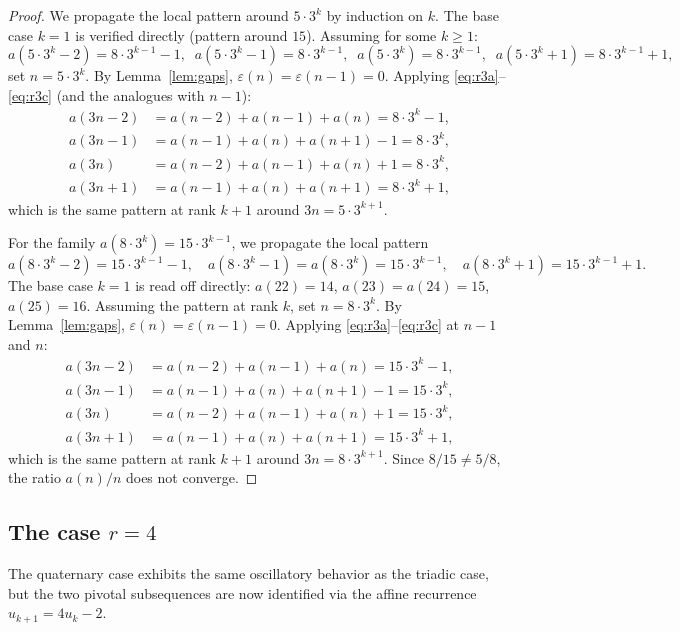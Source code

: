 \documentclass[12pt]{article}
\theoremstyle{definition}
\theoremstyle{remark}
\begin{document}
\begin{proof}
  We propagate the local pattern around $5\cdot 3^k$ by induction on $k$.
  The base case $k=1$ is verified directly (pattern around $15$).
  Assuming for some $k\ge 1$:
  \[
    a(5\cdot 3^k-2)=8\cdot 3^{k-1}-1,\;\;
    a(5\cdot 3^k-1)=8\cdot 3^{k-1},\;\;
    a(5\cdot 3^k)  =8\cdot 3^{k-1},\;\;
    a(5\cdot 3^k+1)=8\cdot 3^{k-1}+1,
  \]
  set $n=5\cdot 3^k$. By Lemma~\ref{lem:gaps}, $\varepsilon(n)=\varepsilon(n-1)=0$.
  Applying \eqref{eq:r3a}--\eqref{eq:r3c} (and the analogues with $n-1$):
  \begin{align*}
    a(3n-2) &= a(n-2)+a(n-1)+a(n)   = 8\cdot 3^k-1,\\
    a(3n-1) &= a(n-1)+a(n)+a(n+1)-1 = 8\cdot 3^k,\\
    a(3n)   &= a(n-2)+a(n-1)+a(n)+1 = 8\cdot 3^k,\\
    a(3n+1) &= a(n-1)+a(n)+a(n+1)   = 8\cdot 3^k+1,
  \end{align*}
  which is the same pattern at rank $k+1$ around $3n=5\cdot 3^{k+1}$.

  For the family $a(8\cdot 3^k)=15\cdot 3^{k-1}$, we propagate the local pattern
  \[
    a(8\cdot 3^k-2)=15\cdot 3^{k-1}-1,\quad
    a(8\cdot 3^k-1)=a(8\cdot 3^k)=15\cdot 3^{k-1},\quad
    a(8\cdot 3^k+1)=15\cdot 3^{k-1}+1.
  \]
  The base case $k=1$ is read off directly: $a(22)=14$, $a(23)=a(24)=15$, $a(25)=16$.
  Assuming the pattern at rank $k$, set $n=8\cdot 3^k$.
  By Lemma~\ref{lem:gaps}, $\varepsilon(n)=\varepsilon(n-1)=0$.
  Applying \eqref{eq:r3a}--\eqref{eq:r3c} at $n-1$ and $n$:
  \begin{align*}
    a(3n-2) &= a(n-2)+a(n-1)+a(n)   = 15\cdot 3^k-1,\\
    a(3n-1) &= a(n-1)+a(n)+a(n+1)-1 = 15\cdot 3^k,\\
    a(3n)   &= a(n-2)+a(n-1)+a(n)+1 = 15\cdot 3^k,\\
    a(3n+1) &= a(n-1)+a(n)+a(n+1)   = 15\cdot 3^k+1,
  \end{align*}
  which is the same pattern at rank $k+1$ around $3n=8\cdot 3^{k+1}$.
  Since $8/15\ne 5/8$, the ratio $a(n)/n$ does not converge.
\end{proof}

\subsection{The case $r=4$}

The quaternary case exhibits the same oscillatory behavior as the triadic case,
but the two pivotal subsequences are now identified via the affine recurrence
$u_{k+1}=4u_k - 2$.
\end{document}
